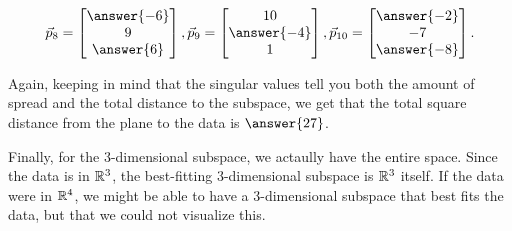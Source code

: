 \documentclass{ximera}
\begin{document}
\begin{problem}
  $$\vec{p}_8=\begin{bmatrix}
    \answer{-6}\\9\\\answer{6}
  \end{bmatrix},\vec{p}_9=\begin{bmatrix}
    10\\\answer{-4}\\1
  \end{bmatrix},\vec{p}_{10}=\begin{bmatrix}
    \answer{-2}\\-7\\\answer{-8}
  \end{bmatrix}.$$

  Again, keeping in mind that the singular values tell you both the amount of spread and the total distance to the subspace, we get that the total square distance from the plane to the data is $\answer{27}$.

  Finally, for the 3-dimensional subspace, we actaully  have the entire space. Since the data is in $\mathbb{R}^3$, the best-fitting 3-dimensional subspace is $\mathbb{R}^3$ itself. If the data were in $\mathbb{R}^4$, we might be able to have a 3-dimensional subspace that best fits the data, but that we could not visualize this.
  
\end{problem}
\end{document}

